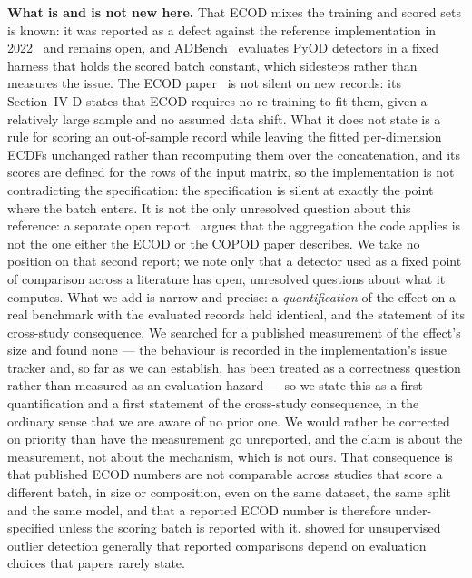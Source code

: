 \documentclass[manuscript,screen,nonacm]{acmart}
\begin{document}
\textbf{What is and is not new here.} That ECOD mixes the training and scored
sets is known: it was reported as a defect against the reference implementation
in 2022~\citep{pyod401} and remains open, and ADBench~\citep{han2022adbench}
evaluates PyOD detectors in a fixed harness that holds the scored batch
constant, which sidesteps rather than measures the issue. The ECOD
paper~\citep{li2023ecod} is not silent on new records: its Section~IV-D states
that ECOD requires no re-training to fit them, given a relatively large sample
and no assumed data shift. What it does not state is a rule for scoring an
out-of-sample record while leaving the fitted per-dimension ECDFs unchanged
rather than recomputing them over the concatenation, and its scores are defined
for the rows of the input matrix, so the implementation is not contradicting
the specification: the specification is silent at exactly the point where the
batch enters. It is not the only unresolved question about this reference: a separate
open report~\citep{pyod561} argues that the aggregation the code applies is not
the one either the ECOD or the COPOD paper describes. We take no position on
that second report; we note only that a detector used as a fixed point of
comparison across a literature has open, unresolved questions about what it
computes. What we add is narrow and precise: a \emph{quantification} of the
effect on a real benchmark with the evaluated records held identical, and the
statement of its cross-study consequence. We searched for a published
measurement of the effect's size and found none --- the behaviour is recorded
in the implementation's issue tracker and, so far as we can establish, has been
treated as a correctness question rather than measured as an evaluation
hazard --- so we state this as a first quantification and a first statement of
the cross-study consequence, in the ordinary sense that we are aware of no
prior one. We would rather be corrected on priority than have the measurement
go unreported, and the claim is about the measurement, not about the mechanism,
which is not ours. That consequence is that published
ECOD numbers are not comparable across studies that score a different batch,
in size or composition, even on the same dataset, the same split and the same
model, and that a reported ECOD number is therefore under-specified unless the
scoring batch is reported with it. \citet{campos2016evaluation} showed for
unsupervised outlier detection generally that reported comparisons depend on
evaluation choices that papers rarely state.
\end{document}
